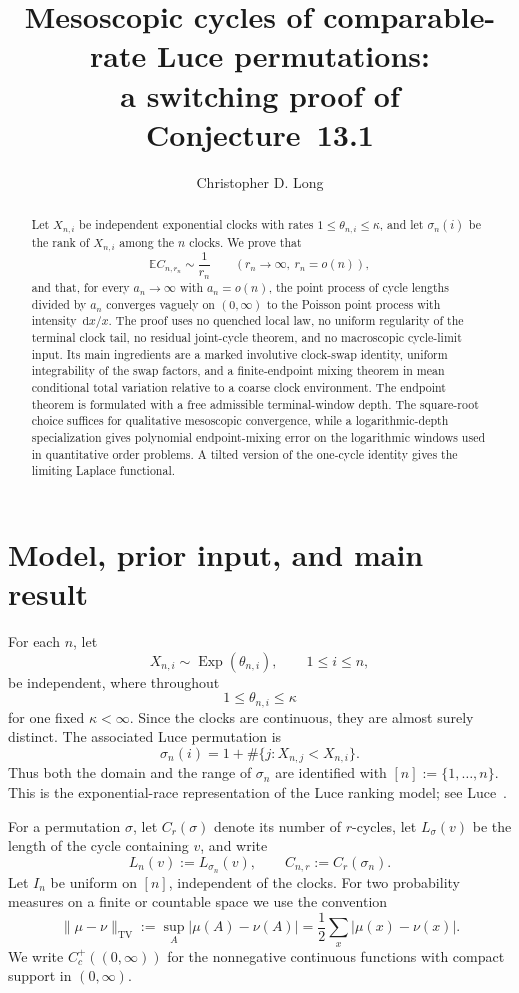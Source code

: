 \documentclass[11pt]{article}
\title{Mesoscopic cycles of comparable-rate Luce permutations:\\
a switching proof of Conjecture~13.1}
\author{Christopher D. Long}
\date{}
\newcommand{\E}{\mathbb E}
\newcommand{\1}{\mathbf 1}
\newcommand{\TV}{\mathrm{TV}}
\newcommand{\Exp}{\operatorname{Exp}}
\newcommand{\dd}{\,\mathrm d}
\theoremstyle{definition}
\theoremstyle{remark}
\begin{document}
\maketitle

\begin{abstract}
Let $X_{n,i}$ be independent exponential clocks with rates
$1\leq \theta_{n,i}\leq \kappa$, and let $\sigma_n(i)$ be the rank of
$X_{n,i}$ among the $n$ clocks.  We prove that
\[
  \E C_{n,r_n}\sim \frac1{r_n}
  \qquad (r_n\to\infty,\ r_n=o(n)),
\]
and that, for every $a_n\to\infty$ with $a_n=o(n)$, the point process of
cycle lengths divided by $a_n$ converges vaguely on $(0,\infty)$ to the
Poisson point process with intensity $\dd x/x$.  The proof uses no
quenched local law, no uniform regularity of the terminal clock tail, no
residual joint-cycle theorem, and no macroscopic cycle-limit input.  Its
main ingredients are a marked involutive clock-swap identity, uniform
integrability of the swap factors, and a finite-endpoint mixing theorem
in mean conditional total variation relative to a coarse clock
environment.  The endpoint theorem is formulated with a free admissible
terminal-window depth.  The square-root choice suffices for qualitative
mesoscopic convergence, while a logarithmic-depth specialization gives
polynomial endpoint-mixing error on the logarithmic windows used in
quantitative order problems.  A tilted version of the one-cycle identity
gives the limiting Laplace functional.
\end{abstract}

\tableofcontents

\section{Model, prior input, and main result}

For each $n$, let
\[
  X_{n,i}\sim \Exp(\theta_{n,i}),\qquad 1\leq i\leq n,
\]
be independent, where throughout
\begin{equation}\label{eq:comparable}
  1\leq \theta_{n,i}\leq \kappa
\end{equation}
for one fixed $\kappa<\infty$.  Since the clocks are continuous, they are
almost surely distinct.  The associated Luce permutation is
\[
  \sigma_n(i)=1+\#\{j:X_{n,j}<X_{n,i}\}.
\]
Thus both the domain and the range of $\sigma_n$ are identified with
$[n]:=\{1,\dots,n\}$.  This is the exponential-race representation of
the Luce ranking model; see Luce~\cite{Luce1959}.

For a permutation $\sigma$, let $C_r(\sigma)$ denote its number of
$r$-cycles, let $L_\sigma(v)$ be the length of the cycle containing $v$,
and write
\[
  L_n(v):=L_{\sigma_n}(v),\qquad C_{n,r}:=C_r(\sigma_n).
\]
Let $I_n$ be uniform on $[n]$, independent of the clocks.  For two
probability measures on a finite or countable space we use the convention
\[
  \|\mu-\nu\|_{\TV}:=\sup_A|\mu(A)-\nu(A)|
  =\frac12\sum_x|\mu(x)-\nu(x)|.
\]
We write $C_c^+((0,\infty))$ for the nonnegative continuous functions
with compact support in $(0,\infty)$.
\end{document}
